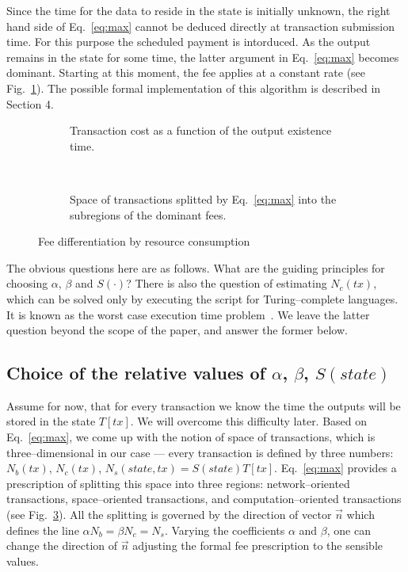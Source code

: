 \documentclass[]{llncs}   %
\begin{document}
Since the time for the data to reside in  the state is initially unknown,
the right hand side of Eq.~\eqref{eq:max} cannot be deduced directly at
transaction submission time. For this purpose the scheduled payment is
intorduced. As the output remains in the state for some time, the latter
argument in Eq.~\eqref{eq:max} becomes dominant. Starting at this moment, the
fee applies at a constant rate (see Fig.~\ref{fig:max_t}). The possible
formal implementation of this algorithm is described in Section 4.
\begin{figure}
    \centering
    \begin{subfigure}[b]{.45\textwidth}
    
    \caption{Transaction cost as a function of the output existence time.
        \newline
        \label{fig:max_t}}
    \end{subfigure}
    ~
    \begin{subfigure}[b]{.45\textwidth}
        
        \caption{Space of transactions splitted by
            Eq.~\eqref{eq:max} into the subregions of the dominant fees.
            \label{fig:max}}
        \end{subfigure}
        \caption{Fee differentiation by resource consumption}
\end{figure}

The obvious questions here are as follows. What are the guiding principles for
choosing $\alpha$, $\beta$ and $S(\cdot)$? There is also the
question of estimating $N_c(tx)$, which can be solved only by executing the
script for Turing--complete languages. It is known as the worst case execution
time problem~\cite{Wilhelm2008}.  We leave the latter question beyond the scope of
the paper, and answer the former below.

\subsection{Choice of the relative values of $\alpha$, $\beta$, $S(state)$}

Assume for now, that for every transaction we know the time the outputs will be
stored in the state $T[tx]$. We will overcome this difficulty later. Based on
Eq.~\eqref{eq:max}, we come up with the notion of space of transactions, which
is three--dimensional in our case --- every transaction is defined by three
numbers: $N_b(tx)$, $N_c(tx)$, $N_s(state,tx) = S(state)T[tx]$. Eq.~\eqref{eq:max} provides a
prescription of splitting this space into three regions: network--oriented
transactions, space--oriented transactions, and computation--oriented
transactions (see Fig.~\ref{fig:max}). All the splitting is governed by the
direction of vector $\vec{n}$ which defines the line $\alpha N_b=\beta N_c=N_s$.
Varying the coefficients $\alpha$ and $\beta$, one can change the direction of
$\vec{n}$ adjusting the formal fee prescription to the sensible values.
\end{document}
